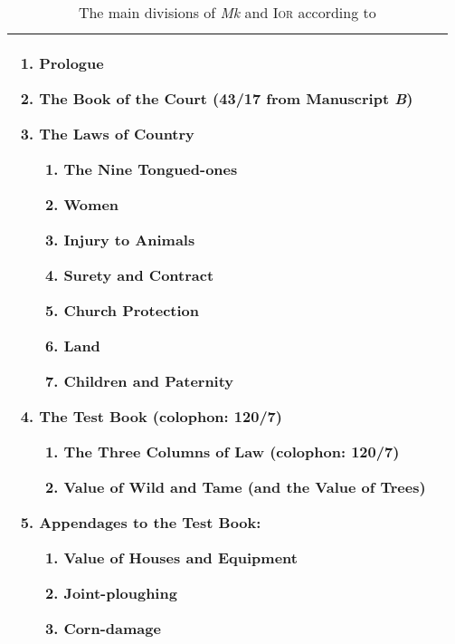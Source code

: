 \begin{table}[h]
\begin{tabular}{@{}p{}p{}@{}}
\begin{enumerate}
\item Prologue
\item The Book of the Court (43/17 from Manuscript \textit{B})
\item The Laws of Country
  \begin{enumerate}
  \item The Nine Tongued-ones
  \item Women
  \item Injury to Animals
  \item Surety and Contract
  \item Church Protection
  \item Land
  \item Children and Paternity
  \end{enumerate}
\item The Test Book (colophon: 120/7)
  \begin{enumerate}
  \item The Three Columns of Law (colophon: 120/7)
  \item Value of Wild and Tame (and the Value of Trees)
  \end{enumerate}
\item Appendages to the Test Book:
  \begin{enumerate}
  \item Value of Houses and Equipment
  \item Joint-ploughing
  \item Corn-damage
  \end{enumerate}
\end{enumerate}\\\bottomrule
\end{tabular}
\caption{The main divisions of \textit{Mk} and \textsc{Ior} according to \textcite[27--28]{charles-edwards_welsh_1989}}
\label{tab:divisions}
\end{table}



